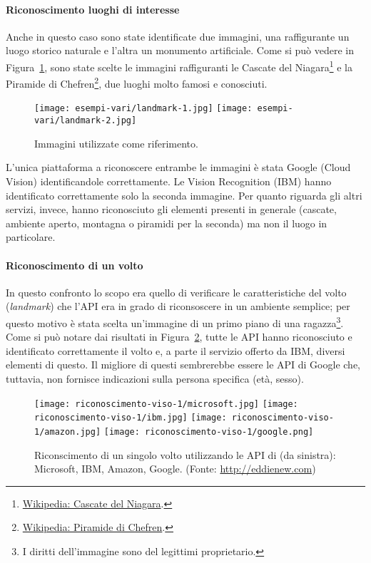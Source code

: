\paragraph{Riconoscimento luoghi di interesse}\label{par:riconscimento-luoghi-interesse}
Anche in questo caso sono state identificate due immagini, una raffigurante un luogo storico naturale e l'altra
un monumento artificiale.
Come si può vedere in Figura~\ref{fig:riconscimento-luoghi-interesse}, sono state scelte le immagini raffiguranti
le Cascate del Niagara\footnote{\href{https://it.wikipedia.org/wiki/Cascate_del_Niagara}{Wikipedia: Cascate del Niagara}.} e
la Piramide di Chefren\footnote{\href{https://it.wikipedia.org/wiki/Piramide_di_Chefren}{Wikipedia: Piramide di Chefren}.},
due luoghi molto famosi e conosciuti.
%
\begin{figure}[!h]
\begin{center}
	\texttt{[image: esempi-vari/landmark-1.jpg]}
	\hfill
	\texttt{[image: esempi-vari/landmark-2.jpg]}
{\scriptsize \caption{Immagini utilizzate come riferimento.}
\label{fig:riconscimento-luoghi-interesse}}
\end{center}
\end{figure}
L'unica piattaforma a riconoscere entrambe le immagini è stata Google (Cloud Vision) identificandole correttamente.
Le Vision Recognition (IBM) hanno identificato correttamente solo la seconda immagine.
Per quanto riguarda gli altri servizi, invece, hanno riconosciuto gli elementi presenti in generale (cascate, ambiente aperto, montagna o piramidi per la seconda)
ma non il luogo in particolare.
%
\paragraph{Riconoscimento di un volto}\label{par:riconscimento-singolo-volto}
In questo confronto lo scopo era quello di verificare le caratteristiche del volto (\textit{landmark}) che l'API era in grado di riconsoscere in un ambiente semplice;
per questo motivo è stata scelta un'immagine di un primo piano di una ragazza\footnote{I diritti dell'immagine sono del legittimi proprietario.}.
Come si può notare dai risultati in Figura~\ref{fig:riconscimento-singolo-volto}, tutte le API hanno riconosciuto e identificato correttamente il volto e, a parte
il servizio offerto da IBM, diversi elementi di questo.
Il migliore di questi sembrerebbe essere le API di Google che, tuttavia, non fornisce indicazioni sulla persona specifica (età, sesso).
\begin{figure}[!h]
\begin{center}
	\texttt{[image: riconoscimento-viso-1/microsoft.jpg]}
	\texttt{[image: riconoscimento-viso-1/ibm.jpg]}
	\texttt{[image: riconoscimento-viso-1/amazon.jpg]}
	\texttt{[image: riconoscimento-viso-1/google.png]}
{\scriptsize \caption{Riconscimento di un singolo volto utilizzando le API di (da sinistra): Microsoft, IBM, Amazon, Google. (Fonte: \url{http://eddienew.com})}
\label{fig:riconscimento-singolo-volto}}
\end{center}
\end{figure}
%
